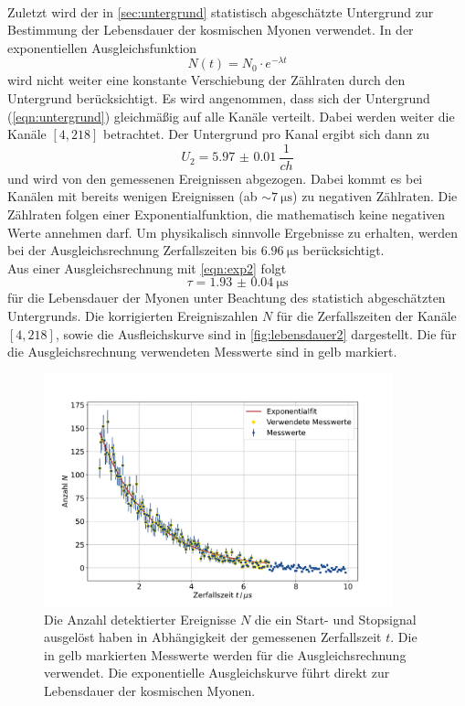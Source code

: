 \\
Zuletzt wird der in \autoref{sec:untergrund} statistisch abgeschätzte Untergrund zur Bestimmung der Lebensdauer der kosmischen Myonen verwendet.
In der exponentiellen Ausgleichsfunktion
\begin{equation}
    N(t) = N_0 \cdot e^{- \lambda t}
    \label{eqn:exp2}
\end{equation}
wird nicht weiter eine konstante Verschiebung der Zählraten durch den Untergrund berücksichtigt.
Es wird angenommen, dass sich der Untergrund (\autoref{eqn:untergrund}) gleichmäßig auf alle Kanäle verteilt.
Dabei werden weiter die Kanäle $[4,218]$ betrachtet.
Der Untergrund pro Kanal ergibt sich dann zu
\begin{equation}
    U_2 = \qty{5.97(1)}{\frac{1}{ch}}
\end{equation}
und wird von den gemessenen Ereignissen abgezogen.
Dabei kommt es bei Kanälen mit bereits wenigen Ereignissen (ab $\sim \qty{7}{\micro\second}$) zu negativen Zählraten.
Die Zählraten folgen einer Exponentialfunktion, die mathematisch keine negativen Werte annehmen darf.
Um physikalisch sinnvolle Ergebnisse zu erhalten, werden bei der Ausgleichsrechnung Zerfallszeiten bis $\qty{6.96}{\micro\second}$ berücksichtigt.
\\
Aus einer Ausgleichsrechnung mit \autoref{eqn:exp2} folgt
\begin{equation}
    \tau = \qty{1.93(4)}{\micro\second}
\end{equation}
für die Lebensdauer der Myonen unter Beachtung des statistich abgeschätzten Untergrunds.
Die korrigierten Ereigniszahlen $N$ für die Zerfallszeiten der Kanäle $[4,218]$, sowie die Ausfleichskurve sind in \autoref{fig:lebensdauer2} dargestellt.
Die für die Ausgleichsrechnung verwendeten Messwerte sind in gelb markiert.
\begin{figure}
    \centering
    \includegraphics[width=0.9\textwidth]{content/plots/lifetime2.pdf}
    \caption{Die Anzahl detektierter Ereignisse $N$ die ein Start- und Stopsignal ausgelöst haben in Abhängigkeit der gemessenen Zerfallszeit $t$.
    Die in gelb markierten Messwerte werden für die Ausgleichsrechnung verwendet.
    Die exponentielle Ausgleichskurve führt direkt zur Lebensdauer der kosmischen Myonen.
    }
    \label{fig:lebensdauer2}
\end{figure}